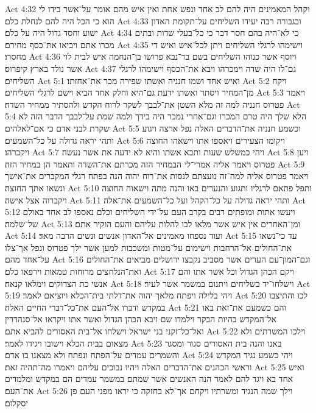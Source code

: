 Act 4:32  וקהל המאמינים היה להם לב אחד ונפש אחת ואין איש מהם אומר על־אשר בידו לי הוא כי הכל היה להם לנחלת כלם׃
Act 4:33  ובגבורה רבה יעידו השליחים על־תקומת האדון ישוע וחסד גדול היה על כלם׃
Act 4:34  כי לא־היה בהם חסר דבר כי כל־בעלי שדות ובתים מכרו אתם ויביאו את־כסף מחירם׃
Act 4:35  וישימהו לרגלי השליחים ויתן לכל־איש ואיש די מחסרו׃
Act 4:36  ויוסף אשר כנוהו השליחים בשם בר־נבא פרושו בן־הנחמה איש לבית לוי אשר נולד בארץ קיפרוס׃
Act 4:37  גם־לו היה שדה וימכרהו ויבא את־הכסף וישימהו לרגלי השליחים׃
Act 5:1  ואיש אחד ושמו חנניה ואשתו שפירה מכר את־אחזתו׃
Act 5:2  ויקח מן־המחיר ויסתר ואשתו ידעת גם־היא וחלק אחד הביא וישם לרגלי השליחים׃
Act 5:3  ויאמר פטרוס חנניה למה זה מלא השטן את־לבבך לשקר לרוח הקדש ולהסתיר ממחיר השדה׃
Act 5:4  הלא שלך היה טרם המכרו וגם־אחרי נמכר היה בידך ולמה שמת על־לבבך הדבר הזה לא שקרת לבני אדם כי אם־לאלהים׃
Act 5:5  וכשמע חנניה את־הדברים האלה נפל ארצה ויגוע ותהי יראה גדולה על כל־השמעים׃
Act 5:6  ויקומו הצעירים ויאספו אתו וישאהו החוצה ויקברהו׃
Act 5:7  ויהי כמשלש שעות ותבא אשתו והיא לא ידעה את אשר נעשה׃
Act 5:8  ויען פטרוס ויאמר אליה אמרי־לי הבמחיר הזה מכרתם את־השדה ותאמר הן במחיר הזה׃
Act 5:9  ויאמר פטרוס אליה למה־זה נועצתם לנסות את־רוח יהוה הנה בפתח רגלי המקברים את־אישך ונשאו אתך החוצה׃
Act 5:10  ותפל פתאם לרגליו ותגוע והנערים באו והנה מתה וישאוה החוצה ויקברוה אצל אישה׃
Act 5:11  ותהי יראה גדולה על כל־הקהל ועל כל־השמעים את־אלה׃
Act 5:12  ויעשו אתות ומופתים רבים בקרב העם על־ידי השליחים וכלם נאספו לב אחד באולם של־שלמה׃
Act 5:13  ומן־האחרים אין איש אשר מלאו לבו להלות עליהם והעם הוקיר אתם׃
Act 5:14  ועוד נספחו מאמינים אל־האדון אנשים ונשים הרבה מאד׃
Act 5:15  עד כי־נשאו את־החולים אל־הרחבות וישימום על־מטות ומשכבות למען אשר ילך פטרוס ונפל אך־צלו על־אחד מהם׃
Act 5:16  וגם־המון־עם הערים אשר מסביב נקבצו ירושלים מביאים את־החולים ואת־הנלחצים מרוחות טמאות וירפאו כלם׃
Act 5:17  ויקם הכהן הגדול וכל אשר אתו והם אנשי כת הצדוקים וימלאו קנאה׃
Act 5:18  וישלחו־יד בשליחים ויתנום במשמר אשר לעיר׃
Act 5:19  ויהי בלילה ויפתח מלאך יהוה את־דלתי בית־הכלא ויוציאם לאמר׃
Act 5:20  לכו והתיצבו במקדש ודברו אל־העם את־כל־דברי החיים האלה׃
Act 5:21  והם כשמעם את־זאת באו אל־המקדש בהיות הבקר וילמדו שם ויבא הכהן הגדול ואשר אתו ויקראו אל־סנהדרין ואל־כל־זקני בני ישראל וישלחו אל־בית האסורים להביא אתם׃
Act 5:22  וילכו המשרתים ולא מצאום בבית הכלא וישובו ויגידו לאמר׃
Act 5:23  באנו והנה בית האסורים סגור ומסגר והשמרים עמדים על־הפתח ונפתח ולא מצאנו בו אדם׃
Act 5:24  ויהי כשמע נגיד המקדש וראשי הכהנים את־הדברים האלה ויהיו נבוכים עליהם ויאמרו מה־תהיה זאת׃
Act 5:25  ואיש אחד בא ויגד להם לאמר הנה האנשים אשר שמתם במשמר עמדים הם במקדש ומלמדים את־העם׃
Act 5:26  וילך שמה הנגיד ומשרתיו ויקחם אך־לא בחזקה כי יראו מפני העם פן יסקלום׃
